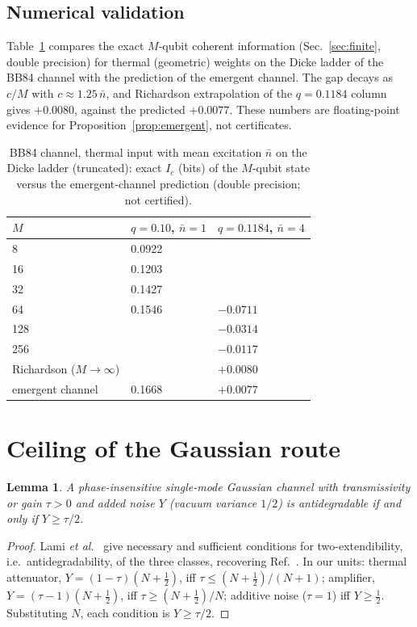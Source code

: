 \documentclass[aps,pra,reprint,superscriptaddress,nofootinbib,longbibliography,floatfix]{revtex4-2}
\newtheorem{lemma}{Lemma}
\theoremstyle{remark}
\newcommand{\Ic}{I_c}
\begin{document}
\subsection{Numerical validation}
\label{sec:validation}
Table~\ref{tab:validation} compares the exact $M$-qubit coherent information (Sec.~\ref{sec:finite},
double precision) for thermal (geometric) weights on the Dicke ladder of the BB84 channel with the
prediction of the emergent channel. The gap decays as $c/M$ with $c\approx1.25\,\bar n$, and Richardson
extrapolation of the $q=0.1184$ column gives $+0.0080$, against the predicted $+0.0077$. These numbers are
floating-point evidence for Proposition~\ref{prop:emergent}, not certificates.

\begin{table}[t]
\caption{BB84 channel, thermal input with mean excitation $\bar n$ on the Dicke ladder (truncated):
exact $\Ic$ (bits) of the $M$-qubit state versus the emergent-channel prediction (double precision;
not certified).}
\label{tab:validation}
\begin{ruledtabular}
\begin{tabular}{lll}
$M$ & $q=0.10$, $\bar n=1$ & $q=0.1184$, $\bar n=4$\\
\hline
8 & 0.0922 & \\
16 & 0.1203 & \\
32 & 0.1427 & \\
64 & 0.1546 & $-0.0711$\\
128 & & $-0.0314$\\
256 & & $-0.0117$\\
Richardson ($M\to\infty$) & & $+0.0080$\\
emergent channel & 0.1668 & $+0.0077$\\
\end{tabular}
\end{ruledtabular}
\end{table}

\section{Ceiling of the Gaussian route}
\label{sec:ceiling}

\begin{lemma}
\label{lem:antideg}
A phase-insensitive single-mode Gaussian channel with transmissivity or gain $\tau>0$ and added noise
$Y$ (vacuum variance $1/2$) is antidegradable if and only if $Y\ge\tau/2$.
\end{lemma}
\begin{proof}
Lami \textit{et al.}~\cite{lami2019extendibility} give necessary and sufficient conditions for
two-extendibility, i.e.\ antidegradability, of the three classes, recovering
Ref.~\cite{caruso2006degradability}. In our units: thermal attenuator, $Y=(1-\tau)(N+\frac12)$, iff
$\tau\le(N+\frac12)/(N+1)$; amplifier, $Y=(\tau-1)(N+\frac12)$, iff $\tau\ge(N+\frac12)/N$; additive noise
($\tau=1$) iff $Y\ge\frac12$. Substituting $N$, each condition is $Y\ge\tau/2$.
\end{proof}
\end{document}
